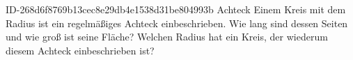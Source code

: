 \begin{exercise}
      {ID-268d6f8769b13cec8e29db4e1538d31be804993b}
      {Achteck}
  \ifproblem\problem
    Einem Kreis mit dem Radius  ist ein regelmäßiges Achteck
    einbeschrieben. Wie lang sind dessen Seiten und wie groß ist seine Fläche?
    Welchen Radius hat ein Kreis, der wiederum diesem Achteck einbeschrieben
    ist?
  \fi
\end{exercise}
